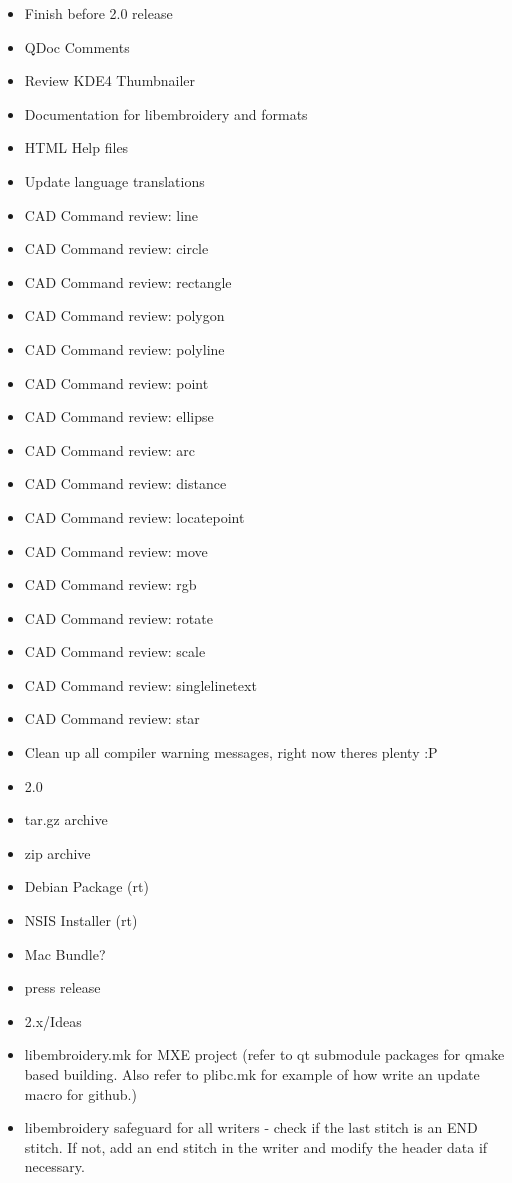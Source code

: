 \documentclass[11pt]{report}
\begin{document}
\begin{itemize}
\item Finish before 2.0 release
  \item QDoc Comments
  \item Review KDE4 Thumbnailer
  \item Documentation for libembroidery and formats
  \item HTML Help files
  \item Update language translations
  \item CAD Command review: line
  \item CAD Command review: circle
  \item CAD Command review: rectangle
  \item CAD Command review: polygon
  \item CAD Command review: polyline
  \item CAD Command review: point
  \item CAD Command review: ellipse
  \item CAD Command review: arc
  \item CAD Command review: distance
  \item CAD Command review: locatepoint
  \item CAD Command review: move
  \item CAD Command review: rgb
  \item CAD Command review: rotate
  \item CAD Command review: scale
  \item CAD Command review: singlelinetext
  \item CAD Command review: star
  \item Clean up all compiler warning messages, right now theres plenty :P
\item 2.0
  \item tar.gz archive
  \item zip archive
  \item Debian Package (rt)
  \item NSIS Installer (rt)
  \item Mac Bundle?
  \item press release
\item 2.x/Ideas
  \item libembroidery.mk for MXE project (refer to qt submodule packages for qmake based building. Also refer to plibc.mk for example of how write an update macro for github.)
  \item libembroidery safeguard for all writers - check if the last stitch is an END stitch. If not, add an end stitch in the writer and modify the header data if necessary.

\end{itemize}
\end{document}
